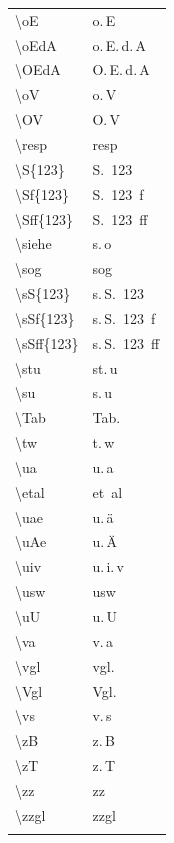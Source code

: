 \begin{table}[caption={Common abbreviation macros for German theses}, label=tab:macros2]
\begin{subfigure}[position=t]{.45\textwidth}
\begin{tabular}{@{}ll@{}}
			\textbackslash oE & \mbox{o.\,E}\xdot \\
			\textbackslash oEdA & \mbox{o.\,E.\,d.\,A}\xdot \\
			\textbackslash OEdA & \mbox{O.\,E.\,d.\,A}\xdot \\ 
			\textbackslash oV & \mbox{o.\,V}\xdot \\
			\textbackslash OV & \mbox{O.\,V}\xdot \\
			\textbackslash resp & \mbox{resp}\xdot \\
			\textbackslash S\{123\} & \mbox{S.~123} \\
			\textbackslash Sf\{123\} & \mbox{S.~123~f}\xdot \\
			\textbackslash Sff\{123\} & \mbox{S.~123~ff}\xdot \\
			\textbackslash siehe & \mbox{s.\,o}\xdot \\
			\textbackslash sog & \mbox{sog}\xdot \\
			\textbackslash sS\{123\}  & \mbox{s.\,S.~123}\\
			\textbackslash sSf\{123\} &\mbox{s.\,S.~123~f}\xdot \\
			\textbackslash sSff\{123\}& \mbox{s.\,S.~123~ff}\xdot \\
			\textbackslash stu & \mbox{st.\,u}\xdot \\
			\textbackslash su & \mbox{s.\,u}\xdot \\
			\textbackslash Tab & \mbox{Tab.~} \\
			\textbackslash tw & \mbox{t.\,w}\xdot \\
			\textbackslash ua & \mbox{u.\,a}\xdot \\
			\textbackslash etal & \mbox{et\ al}\xdot \\
			\textbackslash uae & \mbox{u.\,\"{a}}\xdot \\
			\textbackslash uAe & \mbox{u.\,\"{A}}\xdot \\
			\textbackslash uiv & \mbox{u.\,i.\,v}\xdot \\
			\textbackslash usw & \mbox{usw}\xdot \\
			\textbackslash uU & \mbox{u.\,U}\xdot \\
			\textbackslash va & \mbox{v.\,a}\xdot \\
			\textbackslash vgl & \mbox{vgl.~} \\
			\textbackslash Vgl & \mbox{Vgl.~} \\
			\textbackslash vs & \mbox{v.\,s}\xdot \\
			\textbackslash zB & \mbox{z.\,B}\xdot \\
			\textbackslash zT & \mbox{z.\,T}\xdot \\
			\textbackslash zz & \mbox{zz}\xdot \\
			\textbackslash zzgl & \mbox{zzgl}\xdot \\
 & \\ \bottomrule
	\end{tabular}
	\end{subfigure}
\end{table}

